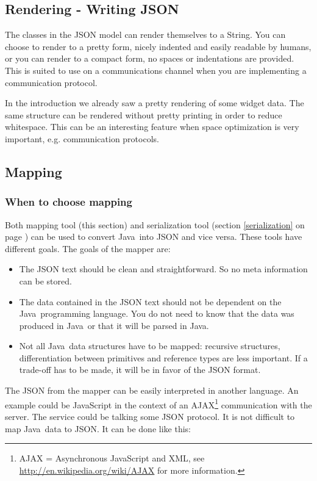 \documentclass[a4paper]{article}
\newcommand{\java}{Java}
\begin{document}
\subsection{Rendering - Writing JSON}

The classes in the JSON model can render themselves to a String. You can choose to render to a pretty form, nicely indented and easily readable by humans, or you can render to a compact form, no spaces or indentations are provided. This is suited to use on a communications channel when you are implementing a communication protocol.

In the introduction we already saw a pretty rendering of some widget data. The same structure can be rendered without pretty printing in order to reduce whitespace. This can be an interesting feature when space optimization is very important, e.g. communication protocols.

\subsection{Mapping}
\label{mapping}
\subsubsection{When to choose mapping}

Both mapping tool (this section) and serialization tool (section \ref{serialization} on page \pageref{serialization}) can be used to convert \java\ into JSON and vice versa. These tools have different goals. The goals of the mapper are:

\begin{itemize}
	\item The JSON text should be clean and straightforward. So no meta information can be stored.
	\item The data contained in the JSON text should not be dependent on the \java\ programming language. You do not need to know that the data was produced in \java\ or that it will be parsed in \java.
	\item Not all \java\ data structures have to be mapped: recursive structures, differentiation between primitives and reference types are less important. If a trade-off has to be made, it will be in favor of the JSON format.
\end{itemize}

The JSON from the mapper can be easily interpreted in another language. An example could be JavaScript in the context of an AJAX\footnote{AJAX = Asynchronous JavaScript and XML, see \url{http://en.wikipedia.org/wiki/AJAX} for more information.} communication with the server. The service could be talking some JSON protocol. It is not difficult to map \java\ data to JSON. It can be done like this:
\end{document}
